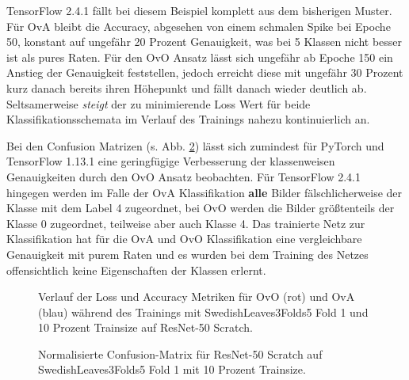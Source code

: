 TensorFlow 2.4.1 \cite{tensorflow} fällt bei diesem Beispiel komplett aus dem bisherigen Muster. Für OvA bleibt die Accuracy, abgesehen von einem schmalen Spike bei Epoche 50, konstant auf ungefähr 20 Prozent Genauigkeit, was bei 5 Klassen nicht besser ist als pures Raten. Für den OvO Ansatz lässt sich ungefähr ab Epoche 150 ein Anstieg der Genauigkeit feststellen, jedoch erreicht diese mit ungefähr 30 Prozent kurz danach bereits ihren Höhepunkt und fällt danach wieder deutlich ab.
Seltsamerweise \textit{steigt} der zu minimierende Loss Wert für beide Klassifikationsschemata im Verlauf des Trainings nahezu kontinuierlich an.

Bei den Confusion Matrizen (s. Abb. \ref{fig:ConfusionMatrixB}) lässt sich zumindest für PyTorch \cite{pytorch} und TensorFlow 1.13.1 \cite{tensorflow} eine geringfügige Verbesserung der klassenweisen Genauigkeiten durch den OvO Ansatz beobachten. Für TensorFlow 2.4.1 \cite{tensorflow} hingegen werden im Falle der OvA Klassifikation \textbf{alle} Bilder fälschlicherweise der Klasse mit dem Label 4 zugeordnet, bei OvO werden die Bilder größtenteils der Klasse 0 zugeordnet, teilweise aber auch Klasse 4. Das trainierte Netz zur Klassifikation hat für die OvA und OvO Klassifikation eine vergleichbare Genauigkeit mit purem Raten und es wurden bei dem Training des Netzes offensichtlich keine Eigenschaften der Klassen erlernt.
\begin{figure}[H]
\begin{adjustbox}{width=1.4\textwidth, center}

\end{adjustbox}
\caption{Verlauf der Loss und Accuracy Metriken für OvO (rot) und OvA (blau) während des Trainings mit SwedishLeaves3Folds5 Fold 1 und 10 Prozent Trainsize auf ResNet-50 Scratch.}
\label{fig:TrainingsverlaufB}
\end{figure}

\begin{figure}[H]
\begin{adjustbox}{width=1.1\textwidth, center}

\end{adjustbox}
\caption{Normalisierte Confusion-Matrix für ResNet-50 Scratch auf SwedishLeaves3Folds5 Fold 1 mit 10 Prozent Trainsize.}
\label{fig:ConfusionMatrixB}
\end{figure}

